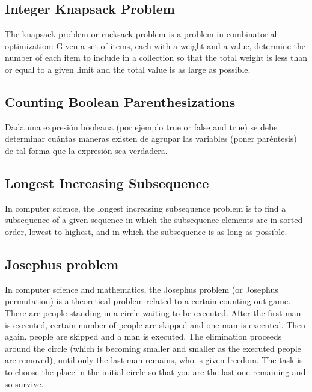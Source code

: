 \documentclass[10pt,letterpaper,twocolumn,twosided]{article}
\newcommand{\codigofuente}[1]{

\dotfill
}
\begin{document}
\codigofuente{src/dp/edit_distance.cpp}

\subsection{Integer Knapsack Problem}

The knapsack problem or rucksack problem is a problem in combinatorial optimization: Given a set of items, each with a weight and a value, determine the number of each item to include in a collection so that the total weight is less than or equal to a given limit and the total value is as large as possible.

\codigofuente{src/dp/knapsack.cpp}

\subsection{Counting Boolean Parenthesizations}

Dada una expresión booleana (por ejemplo true or false and true) se debe determinar cuántas maneras existen de agrupar las variables (poner paréntesis) de tal forma que la expresión sea verdadera.

\subsection{Longest Increasing Subsequence}

In computer science, the longest increasing subsequence problem is to find a subsequence of a given sequence in which the subsequence elements are in sorted order, lowest to highest, and in which the subsequence is as long as possible.

\codigofuente{src/dp/lis.cpp}

\subsection{Josephus problem}

In computer science and mathematics, the Josephus problem (or Josephus permutation) is a theoretical problem related to a certain counting-out game.
There are people standing in a circle waiting to be executed. After the first man is executed, certain number of people are skipped and one man is executed. Then again, people are skipped and a man is executed. The elimination proceeds around the circle (which is becoming smaller and smaller as the executed people are removed), until only the last man remains, who is given freedom.
The task is to choose the place in the initial circle so that you are the last one remaining and so survive.
\end{document}
